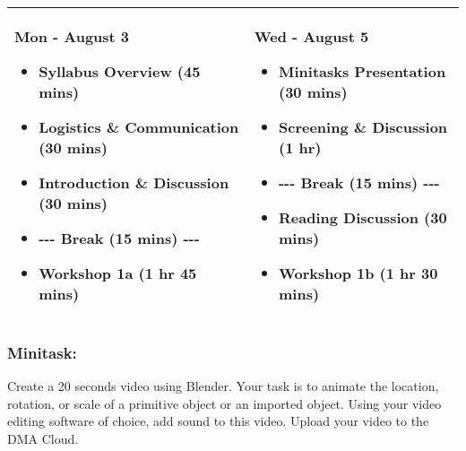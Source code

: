\documentclass[10pt,letter,english]{article}
\begin{document}
\begin{longtable}[]{@{}ll@{}}
      \toprule
      \endhead
      \begin{minipage}[t]{0.47\columnwidth}\raggedright
            \textbf{{Mon - August 3}}

            \begin{itemize}
                  \item
                        Syllabus Overview (45 mins)
                  \item
                        Logistics \& Communication (30 mins)
                  \item
                        Introduction \& Discussion (30 mins)
                  \item
                        -\/-\/- Break (15 mins) -\/-\/-
                  \item
                        Workshop 1a (1 hr 45 mins)
            \end{itemize}\strut
      \end{minipage} & \begin{minipage}[t]{0.47\columnwidth}\raggedright
            \textbf{{Wed - August 5}}

            \begin{itemize}
                  \item
                        Minitasks Presentation (30 mins)
                  \item
                        Screening \& Discussion (1 hr)
                  \item
                        -\/-\/- Break (15 mins) -\/-\/-
                  \item
                        Reading Discussion (30 mins)
                  \item
                        Workshop 1b (1 hr 30 mins)
            \end{itemize}\strut
      \end{minipage}\tabularnewline
      \bottomrule
\end{longtable}

\subsubsection*{Minitask:}

Create a 20 seconds video using Blender. Your task is to animate the location, rotation, or scale of a primitive object or an imported object. Using your video editing software of choice, add sound to this video. Upload your video to the DMA Cloud.
\end{document}
